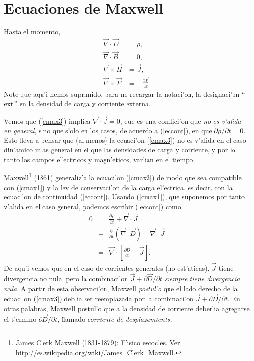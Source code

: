 \section{Ecuaciones de Maxwell}
Hasta el momento,
\begin{align}
\vec\nabla\cdot\vec{D} & =\rho ,\label{cmax1}\\
\vec\nabla\cdot\vec{B}  & =0 ,\label{cmax2}\\
\vec\nabla\times\vec{H}  & =\vec{J} ,\label{cmax3}\\
\vec\nabla\times\vec{E}  & =-\frac{\partial\vec{B}}{\partial t} .\label{cmax4}
\end{align}
Note que aqu'i hemos suprimido, para no recargar la notaci'on, la designaci'on ``${\rm ext}$'' en la densidad de carga y corriente externa.

Vemos que (\ref{cmax3}) implica $\vec\nabla\cdot\vec{J}=0$, que es una condici'on que \textit{no es v'alida en general}, sino que s'olo en los casos, de acuerdo a (\ref{eccont}), en que ${\partial\rho}/{\partial t}=0$. Esto lleva a pensar que (al menos) la ecuaci'on (\ref{cmax3}) no es v'alida en el caso din'amico m'as general en el que las densidades de carga y corriente, y por lo tanto los campos el'ectricos y magn'eticos, var'ian en el tiempo.

Maxwell\footnote{James Clerk Maxwell (1831-1879): F'isico escoc'es. Ver \url{http://es.wikipedia.org/wiki/James_Clerk_Maxwell}.} (1861) generaliz'o la ecuaci'on (\ref{cmax3}) de modo que sea compatible con (\ref{cmax1}) y la ley de conservaci'on de la carga el'ectrica,
es decir, con la ecuaci'on de continuidad (\ref{eccont}). Usando (\ref{cmax1}), que suponemos por tanto v'alida en el caso general, podemos escribir (\ref{eccont}) como
\begin{eqnarray}
 0&=&\frac{\partial\rho}{\partial t}+\vec{\nabla}\cdot\vec{J}\\
&=& \frac{\partial\ }{\partial
t}\left(\vec\nabla\cdot\vec{D}\right)+\vec{\nabla}\cdot\vec{J}\\
&=& \vec\nabla\cdot\left[\frac{\partial\vec{D}}{\partial t}
+\vec{J}\right].
\end{eqnarray}
De aqu'i vemos que en el caso de corrientes generales (no-est'aticas), $\vec{J}$ tiene divergencia no nula, pero la combinaci'on $\vec{J}+{\partial\vec{D}}/{\partial t}$ \textit{siempre tiene divergencia nula}. A partir de esta observaci'on, Maxwell \textit{postul'o} que el lado derecho de la ecuaci'on (\ref{cmax3}) deb'ia ser reemplazada por la combinaci'on $\vec{J}+{\partial\vec{D}}/{\partial t}$. En otras palabras, Maxwell postul'o que a la densidad de corriente deber'ia agregarse el t'ermino ${\partial\vec{D}}/{\partial t}$, llamado \textit{corriente de desplazamiento}.

